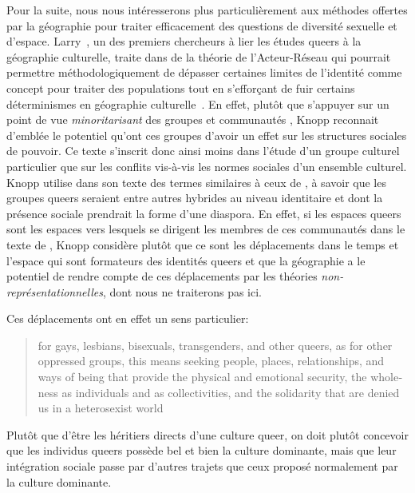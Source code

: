 Pour la suite, nous nous intéresserons plus particulièrement aux méthodes offertes par la géographie pour traiter efficacement des questions de diversité sexuelle et d'espace. 
Larry~\citet{Knopp2004}, un des premiers chercheurs à lier les études queers à la géographie culturelle, traite dans  de la théorie de l'Acteur-Réseau qui pourrait permettre méthodologiquement de dépasser certaines limites de l'identité comme concept pour traiter des populations \lgbt{} tout en s’efforçant de fuir certains déterminismes en géographie culturelle~\citep{Knopp2004}. 
En effet, plutôt que s'appuyer sur un point de vue \emph{minoritarisant} des groupes et communautés \lgbt{}, Knopp reconnait d'emblée le potentiel qu'ont ces groupes d'avoir un effet sur les structures sociales de pouvoir. 
Ce texte s'inscrit donc ainsi moins dans l'étude d'un groupe culturel particulier que sur les conflits vis-à-vis les normes sociales d'un ensemble culturel. 
Knopp utilise dans son texte des termes similaires à ceux de \citet{Sinfield1996}, à savoir que les groupes queers seraient entre autres hybrides au niveau identitaire et dont la présence sociale prendrait la forme d'une diaspora. 
En effet, si les espaces queers sont les espaces vers lesquels se dirigent les membres de ces communautés dans le texte de \citet{Sinfield1996}, Knopp considère plutôt que ce sont les déplacements dans le temps et l'espace qui sont formateurs des identités queers et que la géographie a le potentiel de rendre compte de ces déplacements par les théories \emph{non-représentationnelles}, dont nous ne traiterons pas ici.

Ces déplacements ont en effet un sens particulier:
\foreignblockquote{english}[{\cite[123]{Knopp2004}}][.]{for gays, lesbians,
  bisexuals, transgenders, and other queers, as for other oppressed groups, this
  means seeking people, places, relationships, and ways of being that provide
  the physical and emotional security, the wholeness as individuals and as
  collectivities, and the solidarity that are denied us in a heterosexist world}
Plutôt que d'être les héritiers directs d'une culture queer, on doit plutôt concevoir que les individus queers possède bel et bien la culture dominante, mais que leur intégration sociale passe par d'autres trajets que ceux proposé normalement par la culture dominante.

